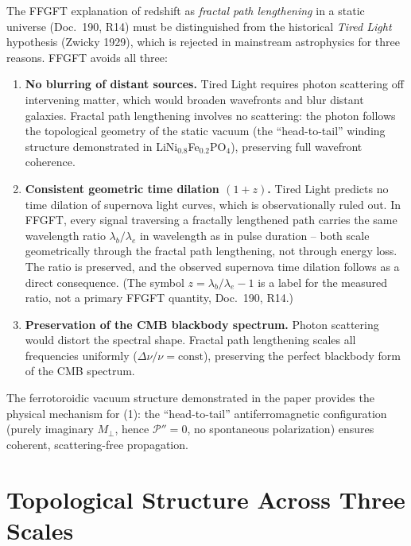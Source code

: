 The FFGFT explanation of redshift as \emph{fractal path lengthening} in a
static universe (Doc.~190, R14) must be distinguished from the historical
\emph{Tired Light} hypothesis (Zwicky 1929), which is rejected in mainstream
astrophysics for three reasons. FFGFT avoids all three:

\begin{enumerate}
  \item \textbf{No blurring of distant sources.} Tired Light requires photon
        scattering off intervening matter, which would broaden wavefronts and
        blur distant galaxies. Fractal path lengthening involves no scattering:
        the photon follows the topological geometry of the static vacuum (the
        ``head-to-tail'' winding structure demonstrated in
        LiNi$_{0.8}$Fe$_{0.2}$PO$_4$), preserving full wavefront coherence.
  \item \textbf{Consistent geometric time dilation $(1+z)$.} Tired Light
        predicts no time dilation of supernova light curves, which is
        observationally ruled out. In FFGFT, every signal traversing a
        fractally lengthened path carries the same wavelength ratio
        $\lambda_b/\lambda_e$ in wavelength as in pulse duration -- both
        scale geometrically through the fractal path lengthening, not through
        energy loss. The ratio is preserved, and the observed supernova time
        dilation follows as a direct consequence.
        (The symbol $z = \lambda_b/\lambda_e - 1$ is a label for the
        measured ratio, not a primary FFGFT quantity, Doc.~190, R14.)
  \item \textbf{Preservation of the CMB blackbody spectrum.} Photon scattering
        would distort the spectral shape. Fractal path lengthening scales all
        frequencies uniformly ($\Delta\nu/\nu = \mathrm{const}$), preserving
        the perfect blackbody form of the CMB spectrum.
\end{enumerate}

\noindent The ferrotoroidic vacuum structure demonstrated in the paper
provides the physical mechanism for (1): the ``head-to-tail'' antiferromagnetic
configuration (purely imaginary $M_\perp$, hence $\mathcal{P}''=0$, no
spontaneous polarization) ensures coherent, scattering-free propagation.

\section{Topological Structure Across Three Scales}

